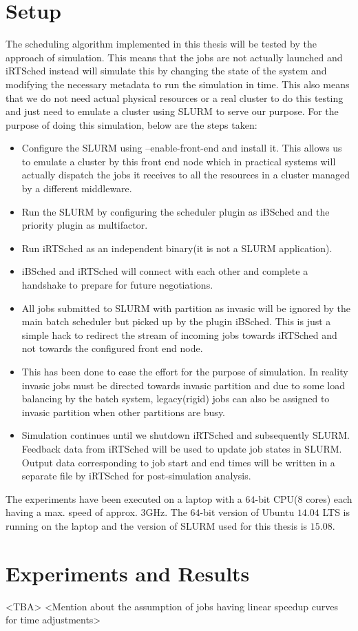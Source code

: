 \section{Setup}
The scheduling algorithm implemented in this thesis will be tested by the approach of simulation. This means that the jobs are not actually launched and iRTSched instead will simulate this by changing the state of the system and modifying the necessary metadata to run the simulation in time. This also means that we do not need actual physical resources or a real cluster to do this testing and just need to emulate a cluster using SLURM to serve our purpose. For the purpose of doing this simulation, below are the steps taken:
\begin{itemize}
\item Configure the SLURM using --enable-front-end and install it. This allows us to emulate a cluster by this front end node which in practical systems will actually dispatch the jobs it receives to all the resources in a cluster managed by a different middleware.
\item Run the SLURM by configuring the scheduler plugin as iBSched and the priority plugin as multifactor.
\item Run iRTSched as an independent binary(it is not a SLURM application).
\item iBSched and iRTSched will connect with each other and complete a handshake to prepare for future negotiations.
\item All jobs submitted to SLURM with partition as invasic will be ignored by the main batch scheduler but picked up by the plugin iBSched. This is just a simple hack to redirect the stream of incoming jobs towards iRTSched and not towards the configured front end node. 
\item This has been done to ease the effort for the purpose of simulation. In reality invasic jobs must be directed towards invasic partition and due to some load balancing by the batch system, legacy(rigid) jobs can also be assigned to invasic partition when other partitions are busy. 
\item Simulation continues until we shutdown iRTSched and subsequently SLURM. Feedback data from iRTSched will be used to update job states in SLURM. Output data corresponding to job start and end times will be written in a separate file by iRTSched for post-simulation analysis.
\end{itemize}
The experiments have been executed on a laptop with a $64$-bit CPU($8$ cores) each having a max. speed of approx. $3$GHz. The $64$-bit version of Ubuntu $14.04$ LTS is running on the laptop and the version of SLURM used for this thesis is $15.08$.
\section{Experiments and Results}
<TBA>
<Mention about the assumption of jobs having linear speedup curves for time adjustments>
